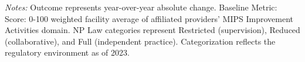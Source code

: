 \begin{table}[htbp]
    \centering
    \caption{Summary of Change in Facility Avg: MIPS Improvement by Authority and Year}
    \label{tab:d_fac_mips_ia_score}
    \vspace{0.2cm}
    \vspace{0.1cm}
    \begin{minipage}{\textwidth}
        \footnotesize \textit{Notes:} Outcome represents year-over-year absolute change. Baseline Metric: Score: 0-100 weighted facility average of affiliated providers' MIPS Improvement Activities domain. NP Law categories represent Restricted (supervision), Reduced (collaborative), and Full (independent practice). Categorization reflects the regulatory environment as of 2023.
    \end{minipage}
\end{table}